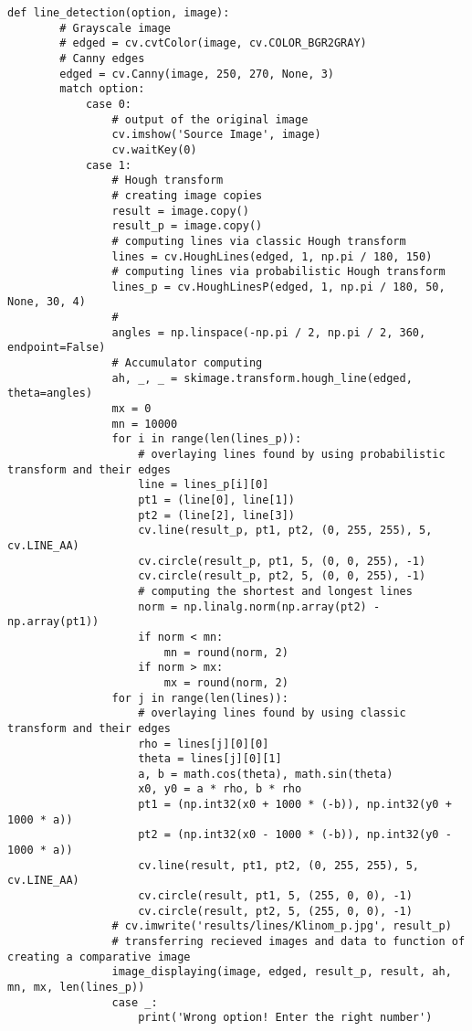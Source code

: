\begin{lstlisting}[caption={Исходный код функции для нахождения и отображения прямых линий с помощью преобразования Хафа}, label={lst:line_compute}]
    def line_detection(option, image):
        # Grayscale image
        # edged = cv.cvtColor(image, cv.COLOR_BGR2GRAY)
        # Canny edges
        edged = cv.Canny(image, 250, 270, None, 3)
        match option:
            case 0:
                # output of the original image
                cv.imshow('Source Image', image)
                cv.waitKey(0)
            case 1:
                # Hough transform
                # creating image copies
                result = image.copy()
                result_p = image.copy()
                # computing lines via classic Hough transform
                lines = cv.HoughLines(edged, 1, np.pi / 180, 150)
                # computing lines via probabilistic Hough transform
                lines_p = cv.HoughLinesP(edged, 1, np.pi / 180, 50, None, 30, 4)
                #
                angles = np.linspace(-np.pi / 2, np.pi / 2, 360, endpoint=False)
                # Accumulator computing
                ah, _, _ = skimage.transform.hough_line(edged, theta=angles)
                mx = 0
                mn = 10000
                for i in range(len(lines_p)):
                    # overlaying lines found by using probabilistic transform and their edges
                    line = lines_p[i][0]
                    pt1 = (line[0], line[1])
                    pt2 = (line[2], line[3])
                    cv.line(result_p, pt1, pt2, (0, 255, 255), 5, cv.LINE_AA)
                    cv.circle(result_p, pt1, 5, (0, 0, 255), -1)
                    cv.circle(result_p, pt2, 5, (0, 0, 255), -1)
                    # computing the shortest and longest lines
                    norm = np.linalg.norm(np.array(pt2) - np.array(pt1))
                    if norm < mn:
                        mn = round(norm, 2)
                    if norm > mx:
                        mx = round(norm, 2)
                for j in range(len(lines)):
                    # overlaying lines found by using classic transform and their edges
                    rho = lines[j][0][0]
                    theta = lines[j][0][1]
                    a, b = math.cos(theta), math.sin(theta)
                    x0, y0 = a * rho, b * rho
                    pt1 = (np.int32(x0 + 1000 * (-b)), np.int32(y0 + 1000 * a))
                    pt2 = (np.int32(x0 - 1000 * (-b)), np.int32(y0 - 1000 * a))
                    cv.line(result, pt1, pt2, (0, 255, 255), 5, cv.LINE_AA)
                    cv.circle(result, pt1, 5, (255, 0, 0), -1)
                    cv.circle(result, pt2, 5, (255, 0, 0), -1)
                # cv.imwrite('results/lines/Klinom_p.jpg', result_p)
                # transferring recieved images and data to function of creating a comparative image
                image_displaying(image, edged, result_p, result, ah, mn, mx, len(lines_p))
                case _:
                    print('Wrong option! Enter the right number')
    \end{lstlisting}

